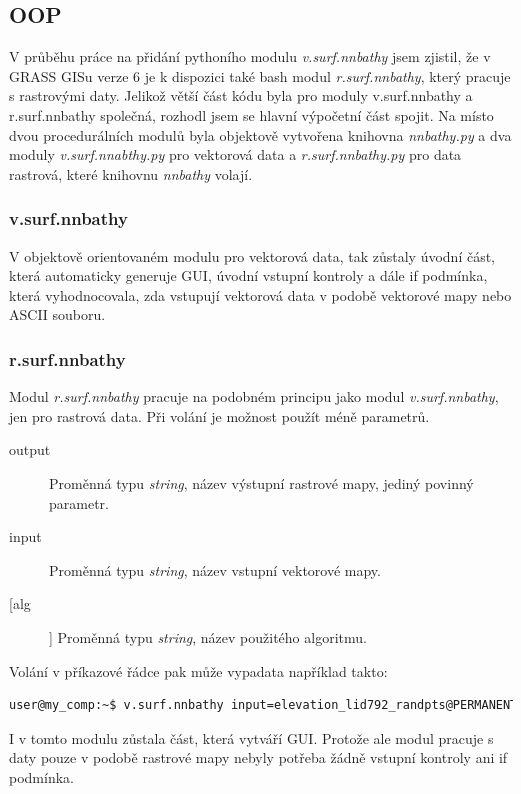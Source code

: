 \documentclass[12pt,a4paper]{article}
\begin{document}
\newpage
\subsection{OOP}
V průběhu práce na přidání pythoního modulu \textit{v.surf.nnbathy} jsem zjistil, že v GRASS GISu verze 6 je k dispozici také bash modul \textit{r.surf.nnbathy}, který pracuje s rastrovými daty. Jelikož větší část kódu byla pro moduly v.surf.nnbathy a r.surf.nnbathy společná, rozhodl jsem se hlavní výpočetní část spojit. Na místo dvou procedurálních modulů byla objektově vytvořena knihovna \textit{nnbathy.py} a dva moduly \textit{v.surf.nnabthy.py} pro vektorová data a \textit{r.surf.nnbathy.py} pro data rastrová, které knihovnu \textit{nnbathy} volají.

\subsubsection{v.surf.nnbathy}
V objektově orientovaném modulu pro vektorová data, tak zůstaly úvodní část, která automaticky generuje GUI, úvodní vstupní kontroly a dále if podmínka, která vyhodnocovala, zda vstupují vektorová data v podobě vektorové mapy nebo ASCII souboru.



\subsubsection{r.surf.nnbathy}
Modul \textit{r.surf.nnbathy} pracuje na podobném principu jako modul \textit{v.surf.nnbathy}, jen pro rastrová data. Při volání je možnost použít méně parametrů.
\begin{description}
\item[output] Proměnná typu \textit{string}, název výstupní rastrové mapy, jediný povinný parametr.
\item[input] Proměnná typu \textit{string}, název vstupní vektorové mapy.
\item[[alg]] Proměnná typu \textit{string}, název použitého algoritmu.
\end{description}

Volání v příkazové řádce pak může vypadata například takto:
\begin{lstlisting}[language=bash,caption={bash version}]
user@my_comp:~$ v.surf.nnbathy input=elevation_lid792_randpts@PERMANENT output=raster_map zcolumn=value alg=nn
\end{lstlisting}

I v tomto modulu zůstala část, která vytváří GUI. Protože ale modul pracuje s daty pouze v podobě rastrové mapy nebyly potřeba žádně vstupní kontroly ani if podmínka.
\end{document}
